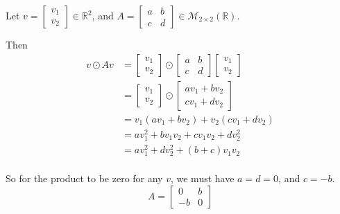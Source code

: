 \documentclass{article}
\begin{document}
\begin{solution}
Let $v=
\begin{bmatrix}
v_{1}\\ v_{2}
\end{bmatrix}
\in\mathbb{R}^{2}$, and $A=
\begin{bmatrix}
a & b\\
c & d
\end{bmatrix}
\in\mathcal{M}_{2\times 2}(\mathbb{R})$.

Then
\begin{align*}
v\odot Av &= 
\begin{bmatrix}
v_{1}\\ v_{2}
\end{bmatrix}
\odot
\begin{bmatrix}
a & b\\
c & d
\end{bmatrix}
\begin{bmatrix}
v_{1}\\ v_{2}
\end{bmatrix}\\
&= 
\begin{bmatrix}
v_{1}\\ v_{2}
\end{bmatrix}
\odot
\begin{bmatrix}
av_{1} + bv_{2}\\
cv_{1} + dv_{2}
\end{bmatrix}\\
&= v_{1}(av_{1} + bv_{2}) +v_{2}(cv_{1} + dv_{2})\\
&= av_{1}^{2} + bv_{1}v_{2} + cv_{1}v_{2} + dv_{2}^{2}\\
&= av_{1}^{2} +  dv_{2}^{2} + (b+c)v_{1}v_{2}\\
\end{align*}

So for the product to be zero for any $v$, we must have $a=d=0$, and $c=-b$.
\[ A = 
\begin{bmatrix}
0 & b \\
-b & 0
\end{bmatrix}
\]
\end{solution}
\end{document}
